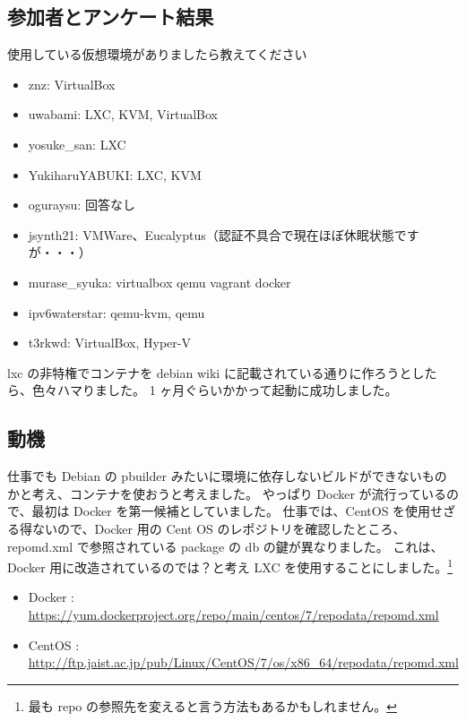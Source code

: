 \documentclass[mingoth,a4paper]{jsarticle}
\begin{document}
\subsection{参加者とアンケート結果}

使用している仮想環境がありましたら教えてください

\begin{itemize}
	\item znz: VirtualBox
	\item uwabami: LXC, KVM, VirtualBox
	\item yosuke\_san: LXC
	\item YukiharuYABUKI: LXC, KVM
	\item oguraysu: 回答なし
	\item jsynth21: VMWare、Eucalyptus（認証不具合で現在ほぼ休眠状態ですが・・・）
	\item murase\_syuka: virtualbox qemu vagrant docker
	\item ipv6waterstar: qemu-kvm, qemu
    \item t3rkwd: VirtualBox, Hyper-V
\end{itemize}


lxc の非特権でコンテナを debian wiki に記載されている通りに作ろうとしたら、色々ハマりました。
1 ヶ月ぐらいかかって起動に成功しました。

\subsection{動機}
仕事でも Debian の pbuilder みたいに環境に依存しないビルドができないものかと考え、コンテナを使おうと考えました。 
やっぱり Docker が流行っているので、最初は Docker を第一候補としていました。
仕事では、CentOS を使用せざる得ないので、Docker 用の Cent OS のレポジトリを確認したところ、
repomd.xml で参照されている package の db の鍵が異なりました。 これは、Docker 用に改造されているのでは？と考え LXC を使用することにしました。\footnote{最も repo の参照先を変えると言う方法もあるかもしれません。}


\begin{itemize}
	\item Docker : \url{https://yum.dockerproject.org/repo/main/centos/7/repodata/repomd.xml} 
	\item CentOS : \url{http://ftp.jaist.ac.jp/pub/Linux/CentOS/7/os/x86_64/repodata/repomd.xml}
\end{itemize}
\end{document}
